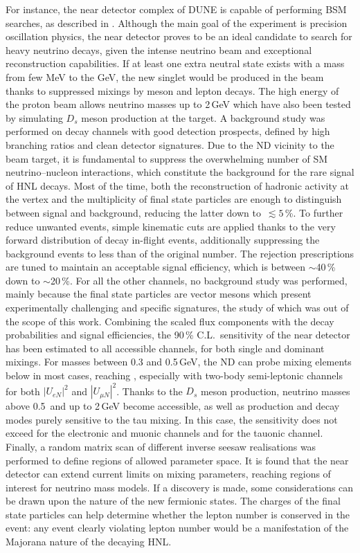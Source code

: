 For instance, the near detector complex of DUNE is capable of performing BSM searches, %
as described in .
Although the main goal of the experiment is precision oscillation physics, %
the near detector proves to be an ideal candidate to search for heavy neutrino decays, %
given the intense neutrino beam and exceptional reconstruction capabilities.
If at least one extra neutral state exists with a mass from few MeV to the GeV, %
the new singlet would be produced in the beam thanks to suppressed mixings by meson and lepton decays.
The high energy of the proton beam allows neutrino masses up to 2\,GeV which have also been tested %
by simulating $D_s$ meson production at the target.
A background study was performed on decay channels with good detection prospects, %
defined by high branching ratios and clean detector signatures.
Due to the ND vicinity to the beam target, it is fundamental to suppress the overwhelming %
number of SM neutrino--nucleon interactions, which constitute the background for the rare signal of HNL decays.
Most of the time, both the reconstruction of hadronic activity at the vertex %
and the multiplicity of final state particles are enough to distinguish between signal and background, %
reducing the latter down to~$\lesssim5$\,\%.
To further reduce unwanted events, simple kinematic cuts are applied thanks to the very forward distribution of %
decay in-flight events, additionally suppressing the background events to less than  of the original number.
The rejection prescriptions are tuned to maintain an acceptable signal efficiency, which is between $\sim$40\,\% down to $\sim$20\,\%.
For all the other channels, no background study was performed, mainly because the final state particles %
are vector mesons which present experimentally challenging and specific signatures, the study of which %
was out of the scope of this work.
Combining the scaled flux components with the decay probabilities and signal efficiencies, %
the 90\,\% C.L.\ sensitivity of the near detector has been estimated to all accessible channels, %
for both single and dominant mixings.
For masses between 0.3 and 0.5\,GeV, the ND can probe mixing elements below  in most cases, %
reaching , especially with two-body semi-leptonic channels for both $|U_{e N}|^2$ and $|U_{\mu N}|^2$.
Thanks to the $D_s$ meson production, neutrino masses above 0.5\, and up to 2\,GeV become accessible, %
as well as production and decay modes purely sensitive to the tau mixing.
In this case, the sensitivity does not exceed  for the electronic and muonic channels and %
 for the tauonic channel.
Finally, a random matrix scan of different inverse seesaw realisations was performed %
to define regions of allowed parameter space.
It is found that the near detector can extend current limits on mixing parameters, %
reaching regions of interest for neutrino mass models.
If a discovery is made, some considerations can be drawn upon the nature of the new fermionic states.
The charges of the final state particles can help determine whether the lepton number %
is conserved in the event: any event clearly violating lepton number would be a manifestation of %
the Majorana nature of the decaying HNL.

